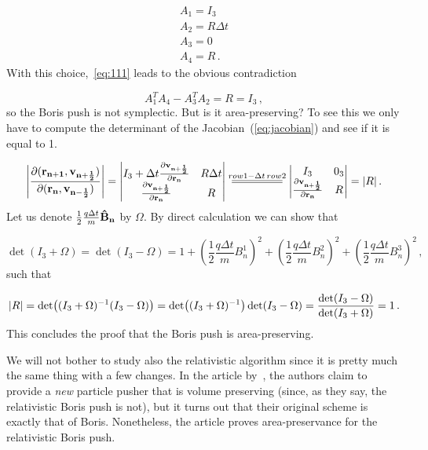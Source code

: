 \documentclass[12pt, class=report, crop=false]{standalone}
\begin{document}
\begin{subequations}
  \begin{align}
    A_1 = I_3\\
    A_2 = R \Delta t\\
    A_3 = 0\\
    A_4 = R\,.
  \end{align}
\end{subequations}
With this choice,~\cref{eq:111} leads to the obvious contradiction

\begin{equation}
  A_1^T A_4 - A_3^T A_2 = R = I_3\,,
\end{equation}
so the Boris push is not symplectic. But is it area-preserving? To see this we only have to compute the determinant of the Jacobian~(\ref{eq:jacobian}) and see if it is equal to 1.

\begin{equation}
  \abs{\pdv{(\vb{r_{n+1}}, \vb{v_{n+\frac{1}{2}}})}{(\vb{r_n}, \vb{v_{n-\frac{1}{2}}})}} =
  \begin{vmatrix}
    I_3 + \Delta t \pdv{\vb{v_{n+\frac{1}{2}}}}{\vb{r_n}} & R \Delta t\\
    \pdv{\vb{v_{n+\frac{1}{2}}}}{\vb{r_n}} & R
  \end{vmatrix}
  \overset{row1 - \Delta t\, row2}{\scalebox{7}[1]{=}}
  \begin{vmatrix}
    I_3 & 0_3\\
    \pdv{\vb{v_{n+\frac{1}{2}}}}{\vb{r_n}} & R
  \end{vmatrix} = \abs{R}\,.
\end{equation}
Let us denote \(\frac{1}{2}\frac{q\Delta t}{m} \vb{\hat{B}_n}\) by \(\Omega\). By direct calculation we can show that

\begin{equation}
  \det(I_3 + \Omega) = \det(I_3 - \Omega) = 1+\left(\frac{1}{2}\frac{q\Delta t}{m} B_n^1\right)^2 + \left(\frac{1}{2}\frac{q\Delta t}{m} B_n^2\right)^2+ \left(\frac{1}{2}\frac{q\Delta t}{m} B_n^3\right)^2 \,,
\end{equation}
such that

\begin{equation}
  \abs{R} = \det((I_3 + \Omega)^{-1} (I_3 - \Omega)) = \det((I_3 + \Omega)^{-1}) \det(I_3 - \Omega) = \frac{\det(I_3 - \Omega)}{\det(I_3 + \Omega)} = 1\,.
\end{equation}
This concludes the proof that the Boris push is area-preserving.

We will not bother to study also the relativistic algorithm since it is pretty much the same thing with a few changes. In the article by~\cite{zhangVolumepreservingAlgorithmSecular2015}, the authors claim to provide a \textit{new} particle pusher that is volume preserving (since, as they say, the relativistic Boris push is not), but it turns out that their original scheme is exactly that of Boris. Nonetheless, the article proves area-preservance for the relativistic Boris push.
\end{document}
